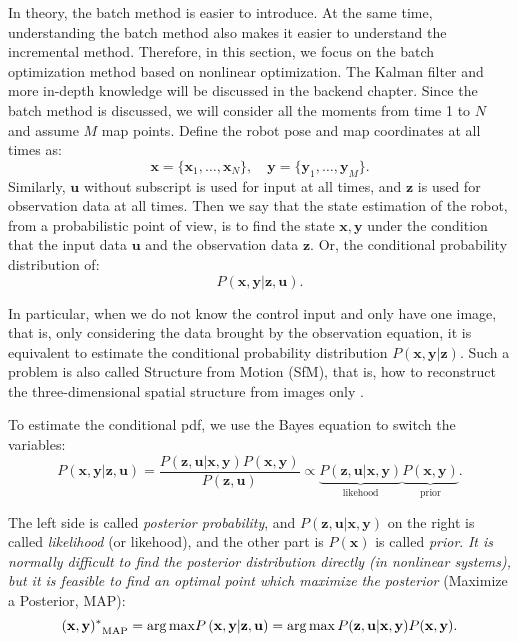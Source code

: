 In theory, the batch method is easier to introduce. At the same time, understanding the batch method also makes it easier to understand the incremental method. Therefore, in this section, we focus on the batch optimization method based on nonlinear optimization. The Kalman filter and more in-depth knowledge will be discussed in the backend chapter. Since the batch method is discussed, we will consider all the moments from time 1 to $N$ and assume $M$ map points. Define the robot pose and map coordinates at all times as:
\[
\mathbf{x}=\{ \mathbf{x}_1, \ldots, \mathbf{x}_N \}, \quad \mathbf{y} = \{\mathbf{y}_1, \ldots, \mathbf{y}_M \}.
\]
Similarly, $ \mathbf {u} $ without subscript is used for input at all times, and $ \mathbf {z} $ is used for observation data at all times. Then we say that the state estimation of the robot, from a probabilistic point of view, is to find the state $ \mathbf {x}, \mathbf{y}$ under the condition that the input data $ \mathbf {u} $ and the observation data $\mathbf{z} $. Or, the conditional probability distribution of:
\begin{equation}
P( \mathbf{x},\mathbf{y} | \mathbf{z}, \mathbf{u}).
\end{equation}


In particular, when we do not know the control input and only have one image, that is, only considering the data brought by the observation equation, it is equivalent to estimate the conditional probability distribution $ P (\mathbf {x}, \mathbf {y} | \mathbf { z}) $. Such a problem is also called Structure from Motion (SfM), that is, how to reconstruct the three-dimensional spatial structure from images only {\cite {Agarwal2009}}.

To estimate the conditional pdf, we use the Bayes equation to switch the variables:
\begin{equation}
P\left( { \mathbf{x},\mathbf{y}| \mathbf{z}, \mathbf{u}} \right) = \frac{{P\left( {\mathbf{z},\mathbf{u}|\mathbf{x},\mathbf{y}} \right)P\left( \mathbf{x}, \mathbf{y} \right)}}{{P\left( \mathbf{z},\mathbf{u}\right)}} \propto \underbrace{P\left(  { \mathbf{z},\mathbf{u}| \mathbf{x},\mathbf{y} } \right)}_{\text{likehood}} \underbrace{P\left( \mathbf{x},\mathbf{y} \right)}_{\text{prior}}.
\end{equation}

The left side is called \textit {posterior probability}, and $ P (\mathbf {z}, \mathbf{u} | \mathbf {x}, \mathbf{y}) $ on the right is called \textit {likelihood} (or likehood), and the other part is $ P (\mathbf {x}) $ is called \textit {prior}. \textit {It is normally difficult to find the posterior distribution directly (in nonlinear systems), but it is feasible to find an optimal point which maximize the posterior} (Maximize a Posterior, MAP):
\begin{equation}
{(\mathbf{x},\mathbf{y})^*}_{\mathrm{MAP}} = \arg {\mathop{\rm max}\nolimits} P \left( {\mathbf{x},\mathbf{y}|\mathbf{z},\mathbf{u}} \right) = \arg \max P(\mathbf{z},\mathbf{u}|\mathbf{x},\mathbf{y})P(\mathbf{x},\mathbf{y}).
\end{equation}


